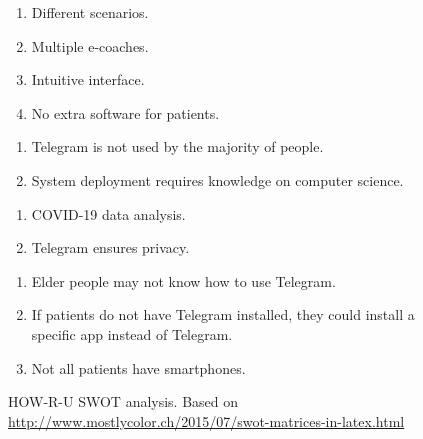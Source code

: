 \documentclass[12pt,english]{article}
\begin{document}
\begin{figure}[H]
  \centering
    \begin{tcbraster}[raster columns=2, boxrule=0mm, arc=0mm]
  \begin{tcolorbox}[equal height group=A, size=fbox, colback=swotS!60, colframe=swotS!80!black, title=\textsc{strengths}]
  \begin{enumerate}
  \item Different scenarios.
  \item Multiple e-coaches.
  \item Intuitive interface.
  \item No extra software for patients.
  \end{enumerate}
  \end{tcolorbox}
  \begin{tcolorbox}[equal height group=A, size=fbox, colback=swotW!60, colframe=swotW!80!black, title=\textsc{weaknesses}]
  \begin{enumerate}
  \item Telegram is not used by the majority of people.
  \item System deployment requires knowledge on computer science.
  \end{enumerate}
  \end{tcolorbox}
  \begin{tcolorbox}[equal height group=B, size=fbox, colback=swotO!60, colframe=swotO!80!black, title=\textsc{opportunities}]
  \begin{enumerate}
  \item COVID-19 data analysis.
  \item Telegram ensures privacy.
  \end{enumerate}
  \end{tcolorbox}
  \begin{tcolorbox}[equal height group=B, size=fbox, colback=swotT!60, colframe=swotT!80!black, title=\textsc{threats}]
  \begin{enumerate}
  \item Elder people may not know how to use Telegram.
  \item If patients do not have Telegram installed, they could install a specific app instead of Telegram.
  \item Not all patients have smartphones.
  \end{enumerate}
  \end{tcolorbox}
  \end{tcbraster}
  \caption{HOW-R-U SWOT analysis. Based on \href{http://www.mostlycolor.ch/2015/07/swot-matrices-in-latex.html}{http://www.mostlycolor.ch/2015/07/swot-matrices-in-latex.html}}
\end{figure}
\end{document}
